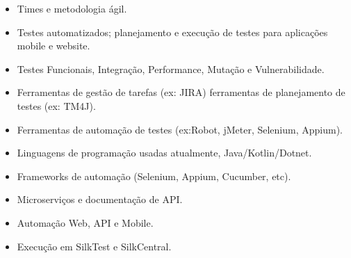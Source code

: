 \documentclass[10pt,a4paper]{altacv}
\begin{document}
	\begin{itemize}
	\item Times e metodologia ágil.
	\item Testes automatizados; planejamento e execução de testes para aplicações mobile e website.
	\item Testes Funcionais, Integração, Performance, Mutação e Vulnerabilidade.
	\item Ferramentas de gestão de tarefas (ex: JIRA) ferramentas de planejamento de testes (ex: TM4J).
	\item Ferramentas de automação de testes (ex:Robot, jMeter, Selenium, Appium).
	\item Linguagens de programação usadas atualmente, Java/Kotlin/Dotnet.
	\item Frameworks de automação (Selenium, Appium, Cucumber, etc).
	\item Microserviços e documentação de API.
	\item Automação Web, API e Mobile.
	\item Execução em SilkTest e SilkCentral.
\end{itemize}

\
\
\end{document}
